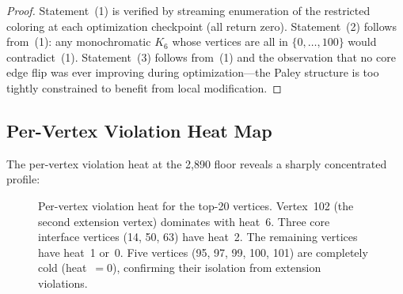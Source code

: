 \documentclass[11pt,a4paper]{article}
\theoremstyle{plain}
\theoremstyle{remark}
\begin{document}
\begin{proof}
Statement~(1) is verified by streaming enumeration of the restricted
coloring at each optimization checkpoint (all return zero).
Statement~(2) follows from~(1): any monochromatic $K_6$ whose
vertices are all in $\{0, \ldots, 100\}$ would contradict~(1).
Statement~(3) follows from~(1) and the observation that no core
edge flip was ever improving during optimization---the Paley
structure is too tightly constrained to benefit from local
modification.
\end{proof}

\subsection{Per-Vertex Violation Heat Map}

The per-vertex violation heat at the 2{,}890 floor reveals a
sharply concentrated profile:

\begin{figure}[H]
\centering
{}
\caption{Per-vertex violation heat for the top-20 vertices. Vertex~102
  (the second extension vertex) dominates with heat~6. Three core
  interface vertices (14, 50, 63) have heat~2. The remaining vertices
  have heat~1 or~0. Five vertices (95, 97, 99, 100, 101) are completely
  cold (heat~$=0$), confirming their isolation from extension violations.}
\label{fig:heatmap}
\end{figure}
\end{document}
